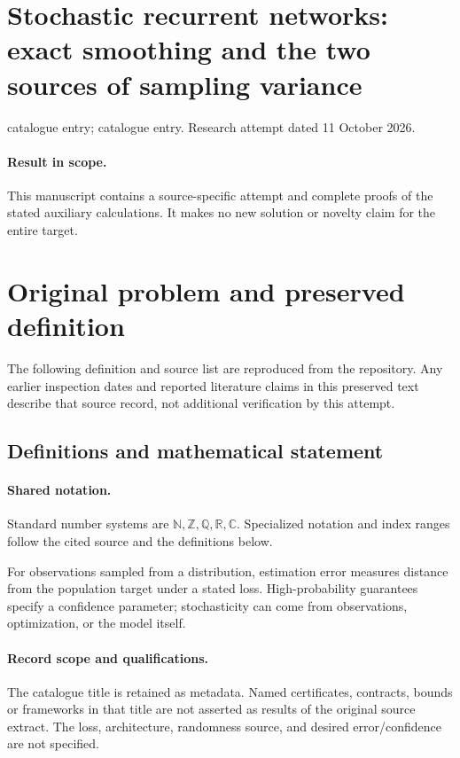 \documentclass[11pt]{article}
\begin{document}
\section*{Stochastic recurrent networks: exact smoothing and the two sources of sampling variance}
\noindent catalogue entry; catalogue entry. Research attempt dated 11 October 2026.
\paragraph{Result in scope.}This manuscript contains a source-specific attempt and complete proofs of the stated auxiliary calculations. It makes no new solution or novelty claim for the entire target.
\section{Original problem and preserved definition}
The following definition and source list are reproduced from the repository. Any earlier inspection dates and reported literature claims in this preserved text describe that source record, not additional verification by this attempt.
\subsection{Definitions and mathematical statement}

\paragraph{Shared notation.}Standard number systems are $\mathbb N,\mathbb Z,\mathbb Q,\mathbb R,\mathbb C$. Specialized notation and index ranges follow the cited source and the definitions below.


For observations sampled from a distribution, estimation error measures distance from the population target under a stated loss. High-probability guarantees specify a confidence parameter; stochasticity can come from observations, optimization, or the model itself.
\paragraph{Record scope and qualifications.}
The catalogue title is retained as metadata. Named certificates, contracts, bounds or frameworks in that title are not asserted as results of the original source extract.
The loss, architecture, randomness source, and desired error/confidence are not specified.
\end{document}
